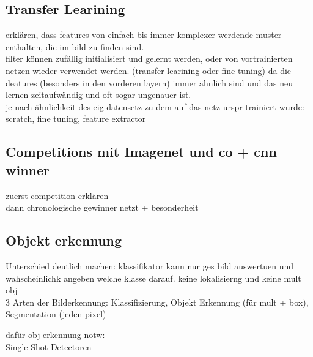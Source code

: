 \subsection{Transfer Learining}

erklären, dass features von einfach bis immer komplexer werdende muster enthalten, die im bild zu finden sind.
\\
filter können zufällig initialisiert und gelernt werden, oder von vortrainierten netzen wieder verwendet
werden. (transfer learining oder fine tuning) da die deatures (besonders in den vorderen layern) immer ähnlich sind und das
neu lernen zeitaufwändig und oft sogar ungenauer ist.
\\
je nach ähnlichkeit des eig datensetz zu dem auf das netz urspr trainiert wurde:\\
scratch, fine tuning, feature extractor



\subsection{Competitions mit Imagenet und co + cnn winner}\label{subsec:comp}

zuerst competition erklären \\
dann chronologische gewinner netzt + besonderheit\\




\subsection{Objekt erkennung}\label{sec:objdet}


Unterschied deutlich machen: klassifikator kann nur ges bild auswertuen und wahscheinlichk angeben welche 
klasse darauf. keine lokalisierng und keine mult obj\\

3 Arten der Bilderkennung: Klassifizierung, Objekt Erkennung (für mult + box), Segmentation (jeden pixel)

dafür obj erkennung notw:\\

Single Shot Detectoren
\\

